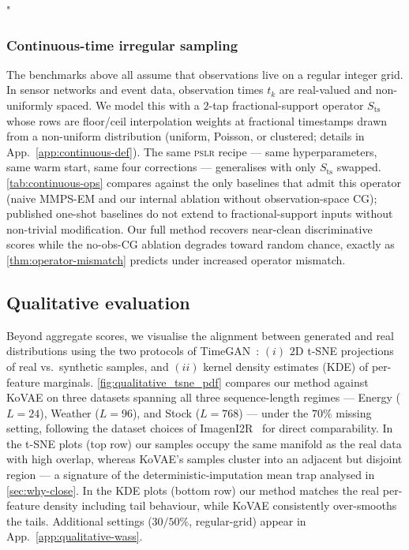 "\documentclass{article}
\theoremstyle{plain}
\theoremstyle{definition}
\theoremstyle{remark}
\newcommand{\pslr}{\textsc{pslr}}
\begin{document}
\subsubsection{Continuous-time irregular sampling}
\label{sec:quant-continuous}

The benchmarks above all assume that observations live on a regular integer grid. In sensor networks and event data, observation times $t_k$ are real-valued and non-uniformly spaced. We model this with a $2$-tap fractional-support operator $S_\mathrm{ts}$ whose rows are floor/ceil interpolation weights at fractional timestamps drawn from a non-uniform distribution (uniform, Poisson, or clustered; details in App.~\ref{app:continuous-def}). The same \pslr{} recipe --- same hyperparameters, same warm start, same four corrections --- generalises with only $S_\mathrm{ts}$ swapped. \cref{tab:continuous-ops} compares against the only baselines that admit this operator (naive MMPS-EM and our internal ablation without observation-space CG); published one-shot baselines do not extend to fractional-support inputs without non-trivial modification. Our full method recovers near-clean discriminative scores while the no-obs-CG ablation degrades toward random chance, exactly as \cref{thm:operator-mismatch} predicts under increased operator mismatch.

\vspace{-1mm}
\subsection{Qualitative evaluation}
\label{sec:qualitative}
\vspace{-1mm}

Beyond aggregate scores, we visualise the alignment between generated and real distributions using the two protocols of TimeGAN~\citep{yoon2019timegan}: $(i)$ $2$D t-SNE projections of real vs.\ synthetic samples, and $(ii)$ kernel density estimates (KDE) of per-feature marginals. \cref{fig:qualitative_tsne_pdf} compares our method against KoVAE on three datasets spanning all three sequence-length regimes --- Energy ($L{=}24$), Weather ($L{=}96$), and Stock ($L{=}768$) --- under the $70\%$ missing setting, following the dataset choices of ImagenI2R~\citep{fadlon2025imageni2r} for direct comparability. In the t-SNE plots (top row) our samples occupy the same manifold as the real data with high overlap, whereas KoVAE's samples cluster into an adjacent but disjoint region --- a signature of the deterministic-imputation mean trap analysed in \cref{sec:why-close}. In the KDE plots (bottom row) our method matches the real per-feature density including tail behaviour, while KoVAE consistently over-smooths the tails. Additional settings ($30/50\%$, regular-grid) appear in App.~\ref{app:qualitative-wass}.
\end{document}
